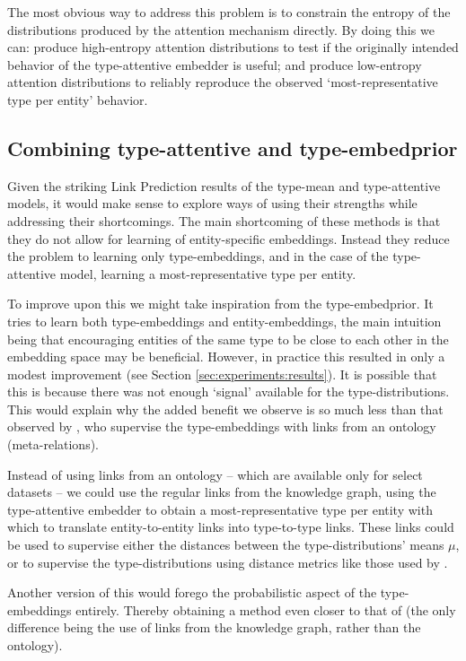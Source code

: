 The most obvious way to address this problem is to constrain the entropy of the distributions produced by the attention mechanism directly.
By doing this we can: produce high-entropy attention distributions to test if the originally intended behavior of the type-attentive embedder is useful; and produce low-entropy attention distributions to reliably reproduce the observed `most-representative type per entity' behavior.


\subsection{Combining type-attentive and type-embedprior}

Given the striking Link Prediction results of the type-mean and type-attentive models, it would make sense to explore ways of using their strengths while addressing their shortcomings. The main shortcoming of these methods is that they do not allow for learning of entity-specific embeddings. Instead they reduce the problem to learning only type-embeddings, and in the case of the type-attentive model, learning a most-representative type per entity.

To improve upon this we might take inspiration from the type-embedprior. It tries to learn both type-embeddings and entity-embeddings, the main intuition being that encouraging entities of the same type to be close to each other in the embedding space may be beneficial. However, in practice this resulted in only a modest improvement (see Section \ref{sec:experiments:results}).
It is possible that this is because there was not enough `signal' available for the type-distributions. This would explain why the added benefit we observe is so much less than that observed by , who supervise the type-embeddings with links from an ontology (meta-relations). 

Instead of using links from an ontology -- which are available only for select datasets -- we could use the regular links from the knowledge graph, using the type-attentive embedder to obtain a most-representative type per entity with which to translate entity-to-entity links into type-to-type links. These links could be used to supervise either the distances between the type-distributions' means $\mu$, or to supervise the type-distributions using distance metrics like those used by .

Another version of this would forego the probabilistic aspect of the type-embeddings entirely. Thereby obtaining a method even closer to that of \citeauthor{hao2019joie} (the only difference being the use of links from the knowledge graph, rather than the ontology).


